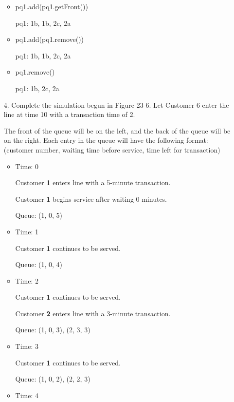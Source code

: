 \documentclass[10pt]{article}
\begin{document}
\begin{enumerate}
\begin{itemize}
				\item pq1.add(pq1.getFront())
					
					pq1: 1b, 1b, 2c, 2a
				
				\item pq1.add(pq1.remove())
					
					pq1: 1b, 1b, 2c, 2a
				
				\item pq1.remove()
					
					pq1: 1b, 2c, 2a
			\end{itemize}
			\vspace{0.5cm}
		
		\item[4.] Complete the simulation begun in Figure 23-6. Let Customer 6 enter the line at time 10 with a transaction time of 2.
			
			\vspace{0.5cm}
			The front of the queue will be on the left, and the back of the queue will be on the right. Each entry in the queue will have the following format: (customer number, waiting time before service, time left for transaction)
			\begin{itemize}
				\item Time: 0
					
					Customer \textbf{1} enters line with a 5-minute transaction.
					
					Customer \textbf{1} begins service after waiting 0 minutes.
					
					Queue: (1, 0, 5)
				
				\item Time: 1
					
					Customer \textbf{1} continues to be served.
					
					Queue: (1, 0, 4)
				
				\item Time: 2
					
					Customer \textbf{1} continues to be served.
					
					Customer \textbf{2} enters line with a 3-minute transaction.
					
					Queue: (1, 0, 3), (2, 3, 3)
				
				\item Time: 3
					
					Customer \textbf{1} continues to be served.
					
					Queue: (1, 0, 2), (2, 2, 3)
				
				\item Time: 4
					

\end{itemize}
\end{enumerate}
\end{document}
